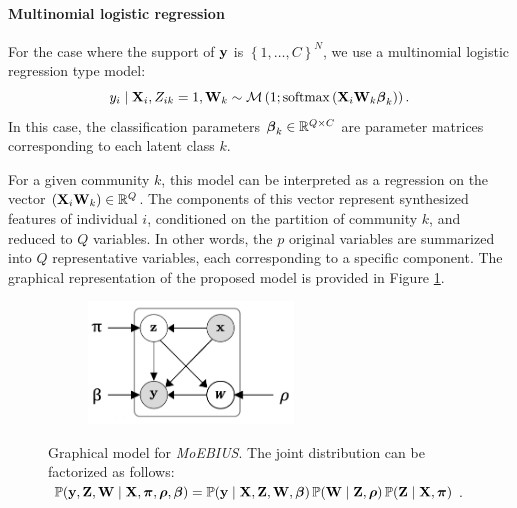 \paragraph{Multinomial logistic regression} For the case where the support of $\mathbf{y}$ is $\left\{1, \dots, C\right\}^N$, we use a multinomial logistic regression type model:
%
\begin{equation} 
y_i \mid \mathbf{X}_i, Z_{ik} = 1, \mathbf{W}_{k} \sim \operatorname{\mathcal{M}}\left(1; \operatorname{softmax}\left( \mathbf{X}_i \mathbf{W}_{k} \boldsymbol{\beta}_k \right)\right).
\label{eq: classif_CCLBM} 
\end{equation}
In this case, the classification parameters $\boldsymbol{\beta}_k \in \mathbb{R}^{Q \times C}$ are parameter matrices corresponding to each latent class $k$.

For a given community \( k \), this model can be interpreted as a regression on the vector \( (\mathbf{X}_i \mathbf{W}_{k }) \in \mathbb{R}^Q \). The components of this vector represent synthesized features of individual \( i \), conditioned on the partition of community \( k \), and reduced to \( Q \) variables. In other words, the \( p \) original variables are summarized into \( Q \) representative variables, each corresponding to a specific component. The graphical representation of the proposed model is provided in Figure \ref{fig: MoEBIUS Rep Graphique}.
%
\begin{figure}[!ht]
     \centering
     \begin{subfigure}[b]{\textwidth}
         \centering
         \includegraphics[width=0.6\textwidth]{Figures/CocoLBMoE_repres.png}
     \end{subfigure}
     \hfill
     \caption{Graphical model for \textit{MoEBIUS}. The joint distribution can be factorized as follows:\newline $\operatorname{\mathbb{P}}(\mathbf{y},\mathbf{Z},\mathbf{W} \mid \mathbf{X},\boldsymbol{\pi}, \boldsymbol{\rho}, \boldsymbol{\beta}) = \operatorname{\mathbb{P}}(\mathbf{y} \mid \mathbf{X},\mathbf{Z},\mathbf{W}, \boldsymbol{\beta}) \operatorname{\mathbb{P}}(\mathbf{W} \mid \mathbf{Z}, \boldsymbol{\rho}) \operatorname{\mathbb{P}}(\mathbf{Z} \mid \mathbf{X},\boldsymbol{\pi})$.}
     \label{fig: MoEBIUS Rep Graphique}
\end{figure}

